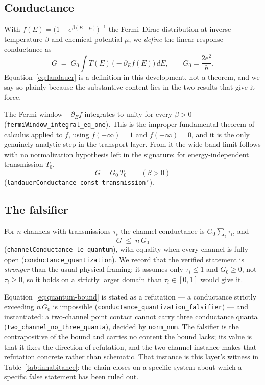 \documentclass[aps,prd,reprint,nofootinbib,superscriptaddress]{revtex4-2}
\newcommand{\thm}[1]{\texttt{#1}}   %
\begin{document}
\subsection{Conductance}

With $f(E)=\bigl(1+e^{\beta(E-\mu)}\bigr)^{-1}$ the Fermi--Dirac distribution at inverse temperature
$\beta$ and chemical potential $\mu$, we \emph{define} the linear-response conductance as
\begin{equation}
G \;=\; G_{0}\!\int T(E)\,\bigl(-\partial_{E}f(E)\bigr)\,dE ,
\qquad G_{0} = \frac{2e^{2}}{h}.
\label{eq:landauer}
\end{equation}
Equation~\eqref{eq:landauer} is a definition in this development, not a theorem, and we say so
plainly because the substantive content lies in the two results that give it force.

The Fermi window $-\partial_{E}f$ integrates to unity for every $\beta>0$
(\thm{fermiWindow\_integral\_eq\_one}). This is the improper fundamental theorem of calculus applied
to $f$, using $f(-\infty)=1$ and $f(+\infty)=0$, and it is the only genuinely analytic step in the
transport layer. From it the wide-band limit follows with no normalization hypothesis left in the
signature: for energy-independent transmission $T_{0}$,
\begin{equation}
G = G_{0}\,T_{0} \qquad (\beta>0)
\label{eq:wideband}
\end{equation}
(\thm{landauerConductance\_const\_transmission'}).

\subsection{The falsifier}

For $n$ channels with transmissions $\tau_{i}$ the channel conductance is $G_{0}\sum_{i}\tau_{i}$,
and
\begin{equation}
G \;\le\; n\,G_{0}
\label{eq:quantum-bound}
\end{equation}
(\thm{channelConductance\_le\_quantum}), with equality when every channel is fully open
(\thm{conductance\_quantization}). We record that the verified statement is \emph{stronger} than the
usual physical framing: it assumes only $\tau_{i}\le1$ and $G_{0}\ge0$, not $\tau_{i}\ge0$, so it
holds on a strictly larger domain than $\tau_{i}\in[0,1]$ would give it.

Equation~\eqref{eq:quantum-bound} is stated as a refutation --- a conductance strictly exceeding
$n\,G_{0}$ is impossible (\thm{conductance\_quantization\_falsifier}) --- and instantiated: a
two-channel point contact cannot carry three conductance quanta
(\thm{two\_channel\_no\_three\_quanta}), decided by \texttt{norm\_num}. The falsifier is the
contrapositive of the bound and carries no content the bound lacks; its value is that it fixes the
direction of refutation, and the two-channel instance makes that refutation concrete rather than
schematic. That instance is this layer's witness in Table~\ref{tab:inhabitance}: the chain closes on
a specific system about which a specific false statement has been ruled out.
\end{document}
